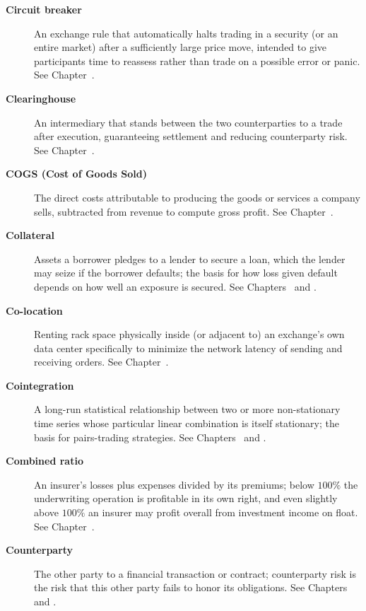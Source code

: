 \documentclass[../ai_in_finance]{subfiles}
\begin{document}
\begin{description}
\item[\textbf{Circuit breaker}] An exchange rule that automatically halts trading in a security (or an entire market) after a sufficiently large price move, intended to give participants time to reassess rather than trade on a possible error or panic. See Chapter~.

\item[\textbf{Clearinghouse}] An intermediary that stands between the two counterparties to a trade after execution, guaranteeing settlement and reducing counterparty risk. See Chapter~.

\item[\textbf{COGS (Cost of Goods Sold)}] The direct costs attributable to producing the goods or services a company sells, subtracted from revenue to compute gross profit. See Chapter~.

\item[\textbf{Collateral}] Assets a borrower pledges to a lender to secure a loan, which the lender may seize if the borrower defaults; the basis for how loss given default depends on how well an exposure is secured. See Chapters~ and .

\item[\textbf{Co-location}] Renting rack space physically inside (or adjacent to) an exchange's own data center specifically to minimize the network latency of sending and receiving orders. See Chapter~.

\item[\textbf{Cointegration}] A long-run statistical relationship between two or more non-stationary time series whose particular linear combination is itself stationary; the basis for pairs-trading strategies. See Chapters~ and .

\item[\textbf{Combined ratio}] An insurer's losses plus expenses divided by its premiums; below $100\%$ the underwriting operation is profitable in its own right, and even slightly above $100\%$ an insurer may profit overall from investment income on float. See Chapter~.

\item[\textbf{Counterparty}] The other party to a financial transaction or contract; counterparty risk is the risk that this other party fails to honor its obligations. See Chapters~ and .


\end{description}
\end{document}
